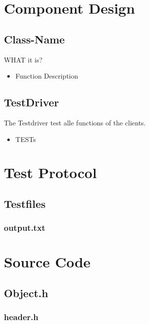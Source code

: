 \newpage
\section{Component Design}
\subsection{Class-Name}
WHAT it is?
\begin{itemize}
	\item Function
	\subitem Description
\end{itemize}

\subsection{TestDriver}
The Testdriver test alle functions of the clients.
\begin{itemize}
	\item TESTs
\end{itemize}

\newpage
\section{Test Protocol}

\subsection{Testfiles}
\subsubsection{output.txt}


\newpage
\section{Source Code}

\subsection{Object.h}
\subsubsection{header.h}
\newpage


